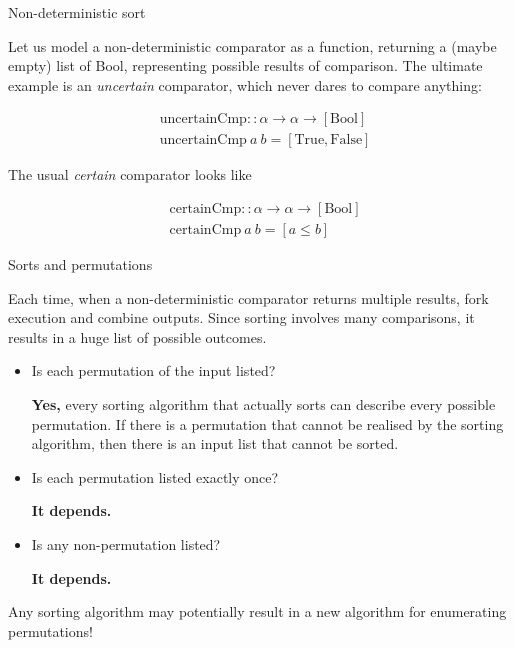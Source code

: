 \documentclass[handout]{beamer}
\begin{document}
\begin{frame}{Non-deterministic sort}

Let us model a non-deterministic comparator as a function, returning a (maybe empty) list of Bool, representing possible results of comparison. The ultimate example is an {\em uncertain} comparator, which never dares to compare anything:

\begin{align*}
& \text{uncertainCmp} :: \alpha \to \alpha \to [\text{Bool}] \\
& \text{uncertainCmp} ~ a ~ b = [\text{True}, \text{False}]
\end{align*}

The usual {\em certain} comparator looks like

\begin{align*}
& \text{certainCmp} :: \alpha \to \alpha \to [\text{Bool}] \\
& \text{certainCmp} ~ a ~ b = [ a \le b ]
\end{align*}

\end{frame}

\begin{frame}{Sorts and permutations}

Each time, when a non-deterministic comparator returns multiple results, fork execution and combine outputs. Since sorting involves many comparisons, it results in a huge list of possible outcomes.

\begin{itemize}

\item Is each permutation of the input listed? \par
  {\bf Yes,} every sorting algorithm that actually sorts can describe every possible permutation. If there is a permutation that cannot be realised by the sorting algorithm, then there is an input list that cannot be sorted.

\item Is each permutation listed exactly once? \par {\bf It depends.}

\item Is any non-permutation listed? \par {\bf It depends.}
\end{itemize}

Any sorting algorithm may potentially result in a new algorithm for enumerating permutations!

\end{frame}
\end{document}
